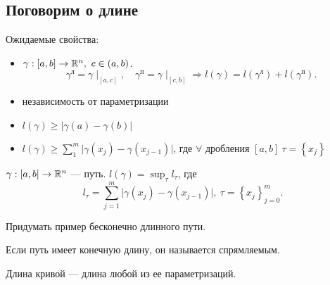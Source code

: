 \subsection{Поговорим о длине}
Ожидаемые свойства:
\begin{itemize}[noitemsep]
    \item $ \gamma : [a, b] \to  \mathbb{R}^{n}, ~ c \in  (a, b) $. 
	\[
	    \gamma^{л} = \gamma \mid_{[a, c]}, \quad \gamma^{п} = \gamma\mid_{[c, b]} \Longrightarrow l(\gamma) = l(\gamma^{л}) + l(\gamma^{п})
	.\] 
    \item независимость от параметризации
    \item $ l(\gamma) \ge  \lvert \gamma(a) - \gamma(b) \rvert $
    \item
	$ l(\gamma) \ge \sum_{1}^{m} \lvert \gamma(x_j) - \gamma(x_{j-1}) \rvert $,
	где $ \forall  \text{ дробления }[a, b] ~\tau = \left\{ x_j \right\}  $
\end{itemize}
\begin{defn}
$ \gamma: [a, b] \to  \mathbb{R}^{n} $ --- путь. $ l(\gamma) = \sup_{\tau} l_{\tau}$, где   
\[
    l_{\tau} = \sum_{j=1}^{m} \lvert \gamma(x_j) -\gamma(x_{j-1}) \rvert, ~ \tau =  \left\{ x_j \right\}_{j=0}^{m}  
.\] 
\end{defn}
\begin{prac}
    Придумать пример бесконечно длинного пути.
\end{prac}
\begin{defn}
    Если путь имеет конечную длину, он называется {\sf спрямляемым}.
\end{defn}
\begin{defn}
    {\sf Длина кривой} --- длина любой из ее параметризаций.  
\end{defn}
